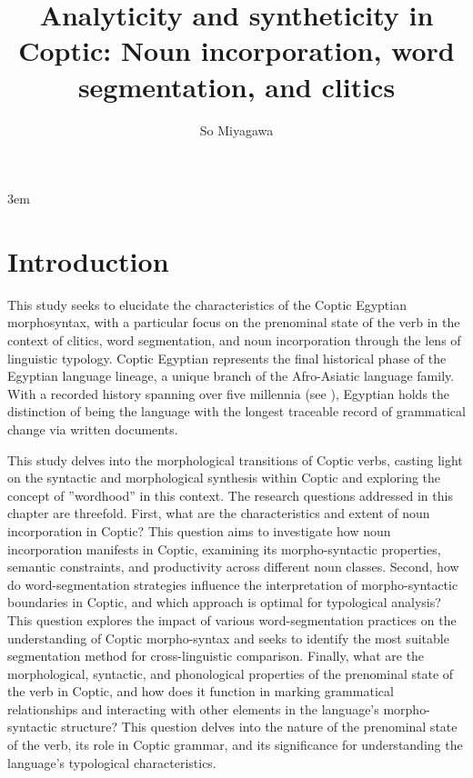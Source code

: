 \documentclass[output=paper,colorlinks,citecolor=brown ,chinesefont]{langscibook}
\author{So Miyagawa\affiliation{University of Tsukuba}}
\title[Analyticity and syntheticity in Coptic]{Analyticity and syntheticity in Coptic: Noun incorporation, word segmentation, and clitics}
\begin{document}
\emergencystretch 3em

\maketitle


\section{Introduction}

This study seeks to elucidate the characteristics of the Coptic Egyptian morphosyntax, with a particular focus on the prenominal state of the verb in the context of clitics, word segmentation, and noun incorporation through the lens of linguistic typology.  Coptic Egyptian represents the final historical phase of the Egyptian language lineage, a unique branch of the Afro-Asiatic language family. With a recorded history spanning over five millennia (see \citealt[97]{kammerzell}),  Egyptian holds the distinction of being the language with the longest traceable record of grammatical change via written documents.


This study delves into the morphological transitions of Coptic verbs, casting light on the syntactic and morphological synthesis within Coptic and exploring the concept of ”wordhood” in this context. The research questions addressed in this chapter are threefold. First, what are the characteristics and extent of noun incorporation in Coptic? This question aims to investigate how noun incorporation manifests in Coptic, examining its morpho-syntactic properties, semantic constraints, and productivity across different noun classes. Second, how do word-segmentation strategies influence the interpretation of morpho-syntactic boundaries in Coptic, and which approach is optimal for typological analysis? This question explores the impact of various word-segmentation practices on the understanding of Coptic morpho-syntax and seeks to identify the most suitable segmentation method for cross-linguistic comparison. Finally, what are the morphological, syntactic, and phonological properties of the prenominal state of the verb in Coptic, and how does it function in marking grammatical relationships and interacting with other elements in the language's morpho-syntactic structure? This question delves into the nature of the prenominal state of the verb, its role in Coptic grammar, and its significance for understanding the language's typological characteristics.
\end{document}

